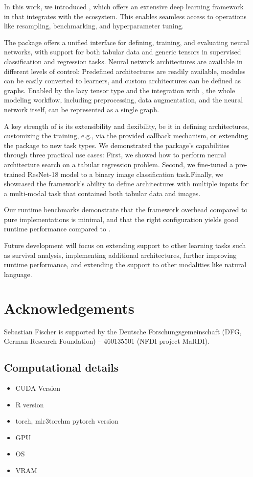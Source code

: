 \documentclass[article]{jss}
\theoremstyle{definition}
\begin{document}
In this work, we introduced , which offers an extensive deep learning framework in \rlang{} that integrates with the \mlrt{} ecosystem.
This enables seamless access to operations like resampling, benchmarking, and hyperparameter tuning.

The package offers a unified interface for defining, training, and evaluating neural networks, with support for both tabular data and generic tensors in supervised classification and regression tasks.
Neural network architectures are available in different levels of control: Predefined architectures are readily available, \torch{} modules can be easily converted to \mlrttorch{} learners, and custom architectures can be defined as graphs.
Enabled by the lazy tensor type and the integration with \mlrtpipelines{}, the whole modeling workflow, including preprocessing, data augmentation, and the neural network itself, can be represented as a single graph.

A key strength of  is its extensibility and flexibility, be it in defining architectures, customizing the training, e.g., via the provided callback mechanism, or extending the package to new task types.
We demonstrated the package's capabilities through three practical use cases: First, we showed how to perform neural architecture search on a tabular regression problem. Second, we fine-tuned a pre-trained ResNet-18 model to a binary image classification task.Finally, we showcased the framework's ability to define architectures with multiple inputs for a multi-modal task that contained both tabular data and images.

Our runtime benchmarks demonstrate that the framework overhead compared to pure \torch{} implementations is minimal, and that the right configuration yields good runtime performance compared to \pytorch{}.

Future development will focus on extending support to other learning tasks such as survival analysis, implementing additional architectures, further improving runtime performance, and extending the support to other modalities like natural language.

\section*{Acknowledgements}

Sebastian Fischer is supported by the Deutsche Forschungsgemeinschaft (DFG, German Research Foundation) – 460135501 (NFDI project MaRDI).



\begin{appendix}

\section{Computational details}\label{app:comp-details}

\begin{itemize}
    \item CUDA Version
    \item R version
    \item torch, mlr3torchm pytorch version
    \item GPU
    \item OS
    \item VRAM
\end{itemize}

\end{appendix}
\end{document}
